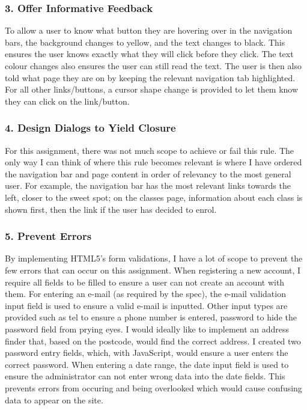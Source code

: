 \documentclass[11pt, article]{article}
\begin{document}
	\subsubsection{3. Offer Informative Feedback}
	To allow a user to know what button they are hovering over in the navigation bars, the background changes to yellow, and the text changes to black. This ensures the user knows exactly what they will click before they click. The text colour changes also ensures the user can still read the text. The user is then also told what page they are on by keeping the relevant navigation tab highlighted. For all other links/buttons, a cursor shape change is provided to let them know they can click on the link/button. 
	
	\subsubsection{4. Design Dialogs to Yield Closure}
	For this assignment, there was not much scope to achieve or fail this rule. The only way I can think of where this rule becomes relevant is where I have ordered the navigation bar and page content in order of relevancy to the most general user. For example, the navigation bar has the most relevant links towards the left, closer to the sweet spot; on the classes page, information about each class is shown first, then the link if the user has decided to enrol. 
	
	\subsubsection{5. Prevent Errors}
	By implementing HTML5's form validations, I have a lot of scope to prevent the few errors that can occur on this assignment. When registering a new account, I require all fields to be filled to ensure a user can not create an account with them. For entering an e-mail (as required by the spec), the e-mail validation input field is used to ensure a valid e-mail is inputted. Other input types are provided such as tel to ensure a phone number is entered, password to hide the password field from prying eyes. I would ideally like to implement an address finder that, based on the postcode, would find the correct address. I created two password entry fields, which, with JavaScript, would ensure a user enters the correct password. When entering a date range, the date input field is used to ensure the administrator can not enter wrong data into the date fields. This prevents errors from occuring and being overlooked which would cause confusing data to appear on the site.
	
\end{document}
